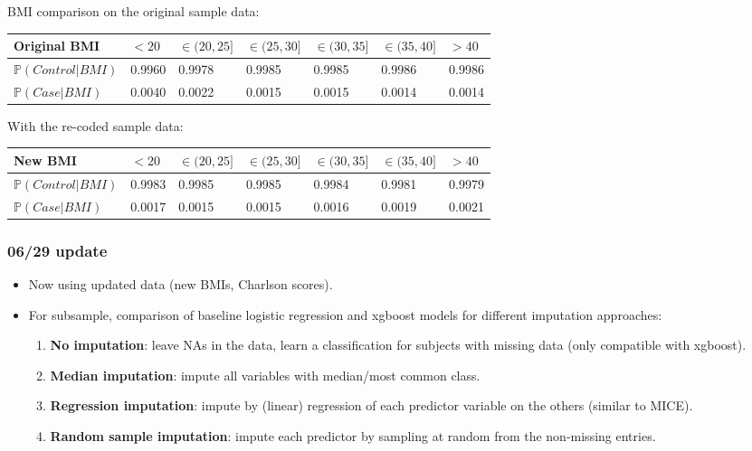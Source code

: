 \documentclass[12pt]{article}
\begin{document}
BMI comparison on the original sample data:
\begin{center}
\begin{tabular}{|l|l|l|l|l|l|l|}
\hline
 \textbf{Original BMI} & $< 20$ & $\in (20,25]$ & $\in (25,30]$ & $\in (30,35]$ & $\in (35,40]$ & $> 40$  \\ \hline
$\mathbb{P}(Control | BMI)$ & 0.9960 & 0.9978 & 0.9985 & 0.9985 & 0.9986 & 0.9986 \\ \hline
$\mathbb{P}(Case | BMI)$ & 0.0040 & 0.0022 & 0.0015 & 0.0015 & 0.0014 & 0.0014 \\ \hline
\end{tabular}
\end{center}

With the re-coded sample data:
\begin{center}
\begin{tabular}{|l|l|l|l|l|l|l|}
\hline
 \textbf{New BMI} & $< 20$ & $\in (20,25]$ & $\in (25,30]$ & $\in (30,35]$ & $\in (35,40]$ & $> 40$  \\ \hline
$\mathbb{P}(Control | BMI)$ & 0.9983 & 0.9985 & 0.9985 & 0.9984 & 0.9981 & 0.9979 \\ \hline
$\mathbb{P}(Case | BMI)$ & 0.0017 & 0.0015 & 0.0015 & 0.0016 & 0.0019 & 0.0021 \\ \hline
\end{tabular}
\end{center}

\pagebreak

\subsubsection*{06/29 update}

\begin{itemize}
  \item Now using updated data (new BMIs, Charlson scores).
  \item For subsample, comparison of baseline logistic regression and xgboost models for different imputation approaches:
  \begin{enumerate}
    \item \textbf{No imputation}: leave NAs in the data, learn a classification for subjects with missing data (only compatible with xgboost).
    \item \textbf{Median imputation}: impute all variables with median/most common class.
    \item \textbf{Regression imputation}: impute by (linear) regression of each predictor variable on the others (similar to MICE).
    \item \textbf{Random sample imputation}: impute each predictor by sampling at random from the non-missing entries.
  \end{enumerate}
\end{itemize}
\end{document}
